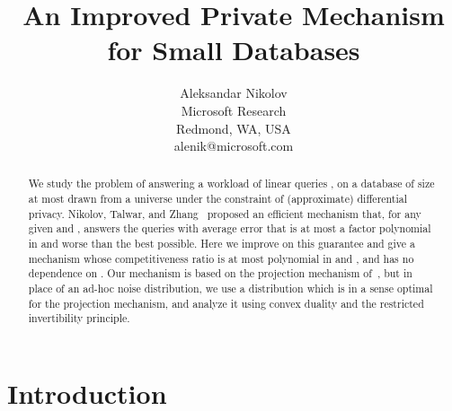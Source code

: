 \documentclass{article}
\begin{document}
\title{An Improved Private Mechanism for Small Databases}
\author{Aleksandar Nikolov\\{Microsoft Research}\\{ Redmond, WA,
    USA}\\{alenik@microsoft.com}} 
\date{}
\maketitle              
\begin{abstract}
  We study the problem of answering a workload of linear queries
  , on a database of size at most  drawn from a
  universe  under the constraint of (approximate) differential
  privacy. Nikolov, Talwar, and Zhang~\cite{NTZ} proposed an efficient
  mechanism that, for any given  and , answers the queries
  with average error that is at most a factor polynomial in  and  worse than the best possible. Here we
  improve on this guarantee and give a mechanism whose competitiveness
  ratio is at most polynomial in  and , and has
  no dependence on . Our mechanism is based on the projection
  mechanism of~\cite{NTZ}, but in place of an ad-hoc noise
  distribution, we use a distribution which is in a sense optimal for
  the projection mechanism, and analyze it using convex duality and
  the restricted invertibility principle.
\end{abstract}

\section{Introduction}
\end{document}
